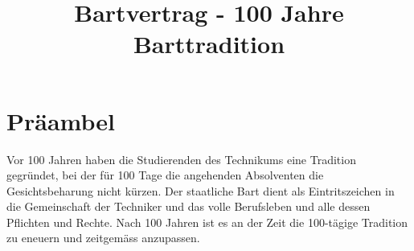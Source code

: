 \documentclass[fontsize=12pt,parskip=half]{scrartcl}
\begin{document}
\title{Bartvertrag - 100 Jahre Barttradition}
\maketitle


\section*{Präambel}
Vor 100 Jahren haben die Studierenden des Technikums eine Tradition gegründet, bei der für 100 Tage die angehenden Absolventen die Gesichtsbeharung nicht kürzen.
Der staatliche Bart dient als Eintritszeichen in die Gemeinschaft der Techniker und das volle Berufsleben und alle dessen Pflichten und Rechte.
Nach 100 Jahren ist es an der Zeit die 100-tägige Tradition zu eneuern und zeitgemäss anzupassen.
\end{document}
